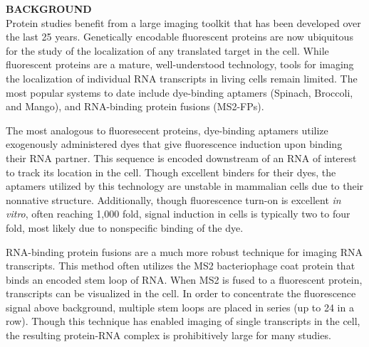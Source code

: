 \textbf{BACKGROUND}\\
Protein studies benefit from a large imaging toolkit that has been developed over the last 25 years. Genetically encodable fluorescent proteins are now ubiquitous for the study of the localization of any translated target in the cell. While fluorescent proteins are a mature, well-understood technology, tools for imaging the localization of individual RNA transcripts in living cells remain limited. The most popular systems to date include dye-binding aptamers (Spinach\cite{PaigeRNAMimicsGreen2011}, Broccoli\cite{FilonovBroccoliRapidSelection2014}, and Mango\cite{AutourFluorogenicRNAMango2018,DolgosheinaRNAMangoAptamerFluorophore2014}), and RNA-binding protein fusions (MS2-FPs).\cite{FuscoSinglemRNAMolecules2003}

The most analogous to fluoresecent proteins, dye-binding aptamers utilize exogenously administered dyes that give fluorescence induction upon binding their RNA partner.\cite{PaigeRNAMimicsGreen2011,FilonovBroccoliRapidSelection2014,AutourFluorogenicRNAMango2018,DolgosheinaRNAMangoAptamerFluorophore2014} This sequence is encoded downstream of an RNA of interest to track its location in the cell. Though excellent binders for their dyes, the aptamers utilized by this technology are unstable in mammalian cells due to their nonnative structure.\cite{EtzelSyntheticRiboswitchesPlug2017} %
Additionally, though fluorescence turn-on is excellent \textit{in vitro}, often reaching 1,000 fold, signal induction in cells is typically two to four fold, most likely due to nonspecific binding of the dye.

RNA-binding protein fusions are a much more robust technique for imaging RNA transcripts.\cite{FuscoSinglemRNAMolecules2003} This method often utilizes the MS2 bacteriophage coat protein that binds an encoded stem loop of RNA. When MS2 is fused to a fluorescent protein, transcripts can be visualized in the cell. In order to concentrate the fluorescence signal above background, multiple stem loops are placed in series (up to 24 in a row). Though this technique has enabled imaging of single transcripts in the cell,\cite{MorisakiRealtimequantificationsingle2016,FuscoSinglemRNAMolecules2003} the resulting protein-RNA complex is prohibitively large for many studies.

